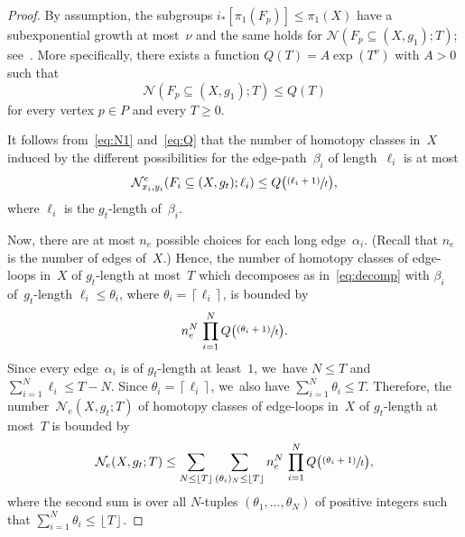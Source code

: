 \documentclass[11pt]{article}
\let\oldsfrac\sfrac
\renewcommand{\sfrac}[2]{{\oldsfrac{#1}{#2}}}
\newcommand{\psfrac}[2]{\sfrac{(#1)}{#2}}
\theoremstyle{definition}
\numberwithin{equation}{section}
\begin{document}
\begin{proof}
By assumption, the subgroups $i_*[\pi_1(F_p)] \leqslant \pi_1(X)$ have a subexponential growth at most~$\nu$ and the same holds for $\mathcal{N}(F_p \subseteq (X,g_1);T)$; see~\cite{manning05}.
More specifically, there exists a function $Q(T)=A \exp(T^\nu)$ with $A>0$ such that\vspace*{-3pt}
\begin{equation} \label{eq:Q}
\mathcal{N}(F_p \subseteq (X,g_1);T) \leq Q(T)
\end{equation}
for every vertex $p \in P$ and every $T \geq 0$.

It follows from~\eqref{eq:N1} and~\eqref{eq:Q} that the number of homotopy classes in~$X$ induced by the different possibilities for the edge-path~$\beta_i$ of length~$\ell_i$ is at most\vspace*{-3pt}
\[
\mathcal{N}^e_{{x_i},{y_i}}(F_i \subseteq (X,g_t);\ell_i) \leq Q \bigl(\psfrac{\ell_i +1}{t} \bigr),
\]
where $\ell_i$ is the $g_t$-length of~$\beta_i$.

Now, there are at most $n_e$ possible choices for each long edge~$\alpha_i$.
(Recall that $n_e$ is the number of edges of~$X$.)
Hence, the number of homotopy classes of edge-loops in~$X$ of $g_t$-length at most~$T$ which decomposes as in~\eqref{eq:decomp} with $\beta_i$ of~$g_t$-length $\ell_i \leq \theta_i$, where $\theta_i = \left \lceil{\ell_i}\right \rceil$, is bounded by\vspace*{-5pt}
\[
n_e^N \, \prod_{i=1}^N Q \bigl(\psfrac{\theta_i +1}{t} \bigr).
\]
Since every edge~$\alpha_i$ is of $g_t$-length at least~$1$, we~have $N \leq T$ and $\sum_{i=1}^N \ell_i \leq T-N$.
Since $\theta_i = \left \lceil{\ell_i}\right \rceil$, we~also have $\sum_{i=1}^N \theta_i \leq T$.
Therefore, the number~$\mathcal{N}_e(X,g_t;T)$ of homotopy classes of edge-loops in~$X$ of $g_t$-length at most~$T$ is bounded by\vspace*{-3pt}
\begin{equation} \label{eq:double}
\mathcal{N}_e(X,g_t;T) \leq \sum_{N \leq \left \lfloor{T}\right \rfloor} \sum_{(\theta_i)_N \leq \left \lfloor{T}\right \rfloor} n_e^N \, \prod_{i=1}^N Q \bigl(\psfrac{\theta_i +1}{t} \bigr),
\end{equation}
where the second sum is over all $N$-tuples $(\theta_1,\dots,\theta_N)$ of positive integers such that \hbox{$\sum_{i=1}^N \theta_i \leq \left \lfloor{T}\right \rfloor$}.


\end{proof}
\end{document}
